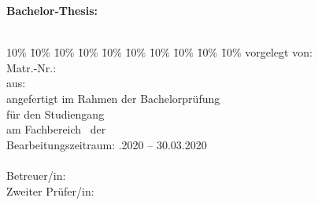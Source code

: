 \begin{titlepage}
  \begin{center}
  \textbf{Bachelor-Thesis:}\\
  \Huge{\myTitel}\\
  \vspace{0.2cm}
  \end{center}
  \normalsize
  \vfill
  \begin{tabbing}
    10\% \= 10\% \= 10\% \= 10\% \= 10\% \= 10\% \= 10\% \= 10\% \= 10\% \= 10\%\kill
    vorgelegt von: \> \> \> \> \> \> \> \> \> \myAutor\\
    Matr.-Nr.: \> \> \> \> \> \> \> \> \> \myMatrikelNr\\
    aus: \> \> \> \> \> \> \> \> \> \myLocation\\
    angefertigt im Rahmen der Bachelorprüfung\\%
    für den Studiengang \myStudiengang \\%
    am Fachbereich \myFachbereich\ der \myHochschulName \\
    Bearbeitungszeitraum: \> \> \> \> \> \> \> \> .2020 -- 30.03.2020 \\
    \\
    Betreuer/in: \> \> \> \> \> \> \> \> \> \myBetreuer\\
    Zweiter Prüfer/in: \> \> \> \> \> \> \> \> \> \myZweitpruefer\\
  \end{tabbing}
\end{titlepage}
